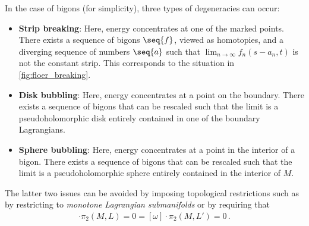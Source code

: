 \begin{property}
        In the case of bigons (for simplicity), three types of degeneracies can occur:
        \begin{itemize}
            \item\textbf{Strip breaking}: Here, energy concentrates at one of the marked points. There exists a sequence of bigons $\seq{f}$, viewed as homotopies, and a diverging sequence of numbers $\seq{a}$ such that
            $\lim_{n\rightarrow\infty}f_n(s-a_n,t)$ is not the constant strip. This corresponds to the situation in \cref{fig:floer_breaking}.
            \item\textbf{Disk bubbling}: Here, energy concentrates at a point on the boundary. There exists a sequence of bigons that can be rescaled such that the limit is a pseudoholomorphic disk entirely contained in one of the boundary Lagrangians.
            \item\textbf{Sphere bubbling}: Here, energy concentrates at a point in the interior of a bigon. There exists a sequence of bigons that can be rescaled such that the limit is a pseudoholomorphic sphere entirely contained in the interior of $M$.
        \end{itemize}
        The latter two issues can be avoided by imposing topological restrictions such as by restricting to \textit{monotone Lagrangian submanifolds} or by requiring that
        \begin{gather}
            [\omega]\cdot\pi_2(M,L)=0=[\omega]\cdot\pi_2(M,L')=0\,.
        \end{gather}
    \end{property}


